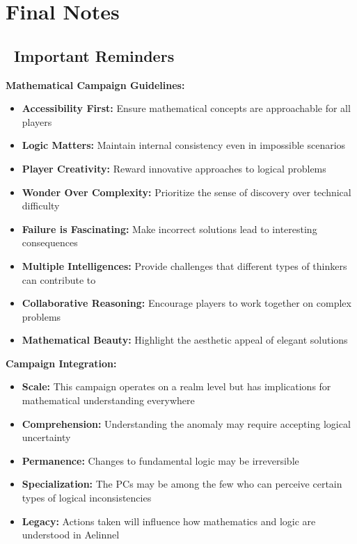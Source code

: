 \documentclass[11pt]{article}
\begin{document}
\section{Final Notes}

\subsection*{\faExclamationTriangle\ Important Reminders}

\textbf{Mathematical Campaign Guidelines:}
\begin{itemize}
    \item \textbf{Accessibility First:} Ensure mathematical concepts are approachable for all players
    \item \textbf{Logic Matters:} Maintain internal consistency even in impossible scenarios
    \item \textbf{Player Creativity:} Reward innovative approaches to logical problems
    \item \textbf{Wonder Over Complexity:} Prioritize the sense of discovery over technical difficulty
    \item \textbf{Failure is Fascinating:} Make incorrect solutions lead to interesting consequences
    \item \textbf{Multiple Intelligences:} Provide challenges that different types of thinkers can contribute to
    \item \textbf{Collaborative Reasoning:} Encourage players to work together on complex problems
    \item \textbf{Mathematical Beauty:} Highlight the aesthetic appeal of elegant solutions
\end{itemize}

\textbf{Campaign Integration:}
\begin{itemize}
    \item \textbf{Scale:} This campaign operates on a realm level but has implications for mathematical understanding everywhere
    \item \textbf{Comprehension:} Understanding the anomaly may require accepting logical uncertainty
    \item \textbf{Permanence:} Changes to fundamental logic may be irreversible
    \item \textbf{Specialization:} The PCs may be among the few who can perceive certain types of logical inconsistencies
    \item \textbf{Legacy:} Actions taken will influence how mathematics and logic are understood in Aelinnel
\end{itemize}
\end{document}
